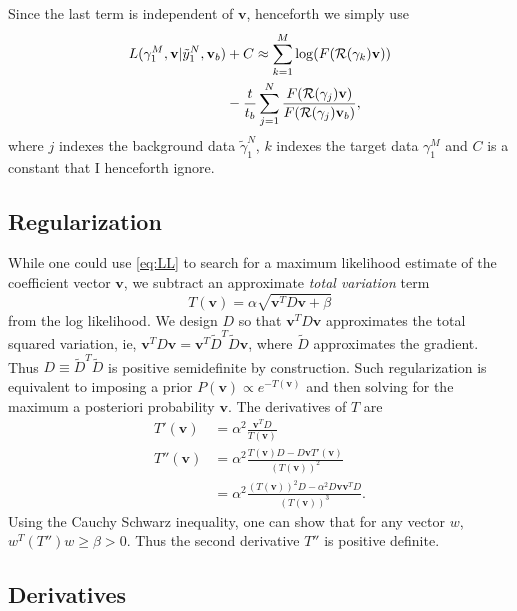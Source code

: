 \documentclass[twocolumn]{article}
\newcommand{\Radon}{{\cal R}}
\newcommand{\av}{\mathbf{v}}%
\newcommand{\loglike}{L}
\begin{document}
Since the last term is independent of $\av$, henceforth we simply
use
\begin{align}
  \loglike(\gamma_1^M,\av|{\tilde y}_1^N,\av_b) & + C \approx \sum_{k=1}^M
  \log(F(\Radon(\gamma_k)\av)) \nonumber \\
  \label{eq:LL}
  & -\frac{t}{t_b}\sum_{j=1}^N \frac{F(\Radon(\gamma_j)\av)}
  {F(\Radon(\gamma_j)\av_b)},
\end{align}
where $j$ indexes the background data $\tilde \gamma_1^N$, $k$
indexes the target data $\gamma_1^M$ and $C$ is a constant that I
henceforth ignore.

\subsection{Regularization}
\label{sec:regularization}

While one could use \eqref{eq:LL} to search for a maximum likelihood
estimate of the coefficient vector $\av$, we subtract an approximate
\emph{total variation} term
\begin{equation*}
  T(\av) = \alpha \sqrt{\av^T D \av + \beta}
\end{equation*}
from the log likelihood.  We design $D$ so that $\av^T D \av$
approximates the total squared variation, ie, $\av^T D \av = \av^T
\tilde D^T \tilde D \av$, where $\tilde D$ approximates the gradient.
Thus $D \equiv \tilde D^T \tilde D$ is positive semidefinite by
construction.  Such regularization is equivalent to imposing a prior
$P(\av) \propto e^{-T(\av)}$ and then solving for the maximum a
posteriori probability $\av$.  The derivatives of $T$ are
\begin{align*}
  T'(\av) &= \alpha^2 \frac{\av^TD}{T(\av)} \\
  T''(\av) &= \alpha^2 \frac{T(\av)D - D\av T'(\av)}{(T(\av))^2} \\
  &= \alpha^2 \frac{(T(\av))^2D - \alpha^2D\av \av^T D}{(T(\av))^3}.
\end{align*}
Using the Cauchy Schwarz inequality, one can show that for any vector
$w$, $w^T(T'')w \geq \beta > 0$.  Thus the second derivative $T''$ is
positive definite.

\subsection{Derivatives}
\label{sec:derivatives}
\end{document}
